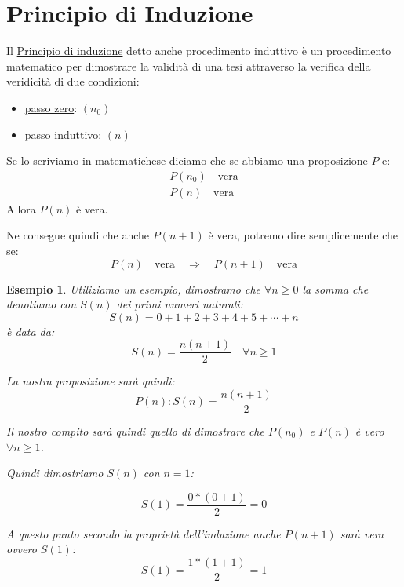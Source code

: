 \documentclass{article}
\newtheorem{exmp}{Esempio}[section]
\begin{document}
\newpage
\section{Principio di Induzione}\label{sec:principio_di_induzione}
Il \underline{Principio di induzione} detto anche procedimento induttivo è un procedimento matematico per dimostrare la validità di una tesi attraverso la verifica della veridicità di due condizioni:
\begin{itemize}
        \item \underline{passo zero}: $(n_0)$
        \item \underline{passo induttivo}: $(n)$
\end{itemize}
Se lo scriviamo in matematichese diciamo che se abbiamo una proposizione $P$ e:
\begin{align*}
        P(n_0) \quad \mbox{vera} \\
        P(n) \quad \mbox{vera}
\end{align*}
Allora $P(n)$ è vera. \par
Ne consegue quindi che anche $P(n+1)$ è vera, potremo dire semplicemente che se:
\begin{equation*}
        P(n) \quad \mbox{vera} \quad \Rightarrow \quad P(n+1) \quad \mbox{vera}
\end{equation*}

\begin{exmp}\label{es:esempio_induzione}
Utiliziamo un esempio, dimostramo che $\forall n \ge 0$ la somma che denotiamo con $S(n)$ dei primi numeri naturali:
\begin{equation*}
        S(n) = 0 + 1 + 2 + 3 + 4 + 5 + \cdots + n
\end{equation*}
è data da:
\begin{equation*}
        S(n) = \frac{n(n+1)}{2} \quad \forall n \ge 1
\end{equation*}

La nostra proposizione sarà quindi:
\begin{equation*}
        P(n) : S(n) = \frac{n(n+1)}{2}
\end{equation*}

Il nostro compito sarà quindi quello di dimostrare che $P(n_0)$ e $P(n)$ è vero $\forall n \ge 1$. \par
Quindi dimostriamo $S(n)$ con $n = 1$:
        
\begin{equation}\label{eq:esempio_induzione_1}
        S(1) = \frac{0*(0+1)}{2} = 0
\end{equation}

A questo punto secondo la proprietà dell'induzione anche $P(n+1)$ sarà vera ovvero $S(1)$:
\begin{equation}\label{eq:esempio_induzione_2}
        S(1) = \frac{1*(1+1)}{2} = 1
\end{equation}
\end{exmp}
\end{document}
